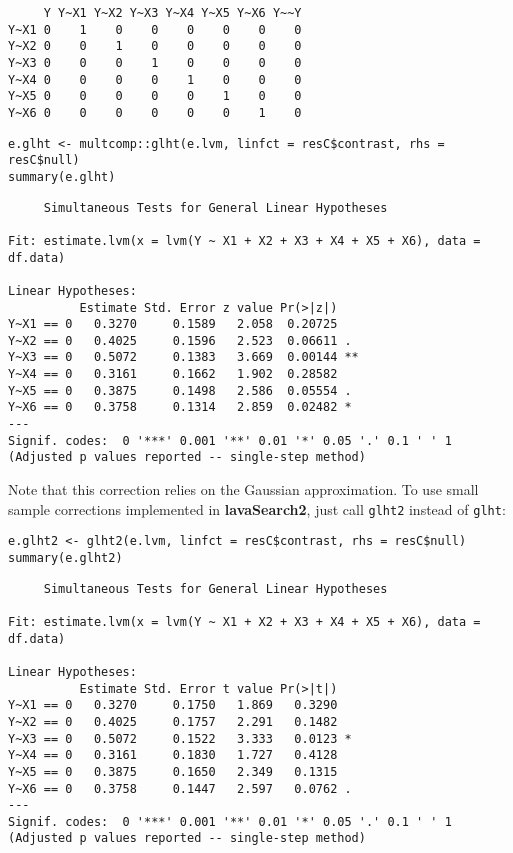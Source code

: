\documentclass[12pt]{article}
\begin{document}
\begin{verbatim}
     Y Y~X1 Y~X2 Y~X3 Y~X4 Y~X5 Y~X6 Y~~Y
Y~X1 0    1    0    0    0    0    0    0
Y~X2 0    0    1    0    0    0    0    0
Y~X3 0    0    0    1    0    0    0    0
Y~X4 0    0    0    0    1    0    0    0
Y~X5 0    0    0    0    0    1    0    0
Y~X6 0    0    0    0    0    0    1    0
\end{verbatim}

\lstset{language=r,label= ,caption= ,captionpos=b,numbers=none}
\begin{lstlisting}
e.glht <- multcomp::glht(e.lvm, linfct = resC$contrast, rhs = resC$null)
summary(e.glht)
\end{lstlisting}
\begin{verbatim}
	 Simultaneous Tests for General Linear Hypotheses

Fit: estimate.lvm(x = lvm(Y ~ X1 + X2 + X3 + X4 + X5 + X6), data = df.data)

Linear Hypotheses:
          Estimate Std. Error z value Pr(>|z|)   
Y~X1 == 0   0.3270     0.1589   2.058  0.20725   
Y~X2 == 0   0.4025     0.1596   2.523  0.06611 . 
Y~X3 == 0   0.5072     0.1383   3.669  0.00144 **
Y~X4 == 0   0.3161     0.1662   1.902  0.28582   
Y~X5 == 0   0.3875     0.1498   2.586  0.05554 . 
Y~X6 == 0   0.3758     0.1314   2.859  0.02482 * 
---
Signif. codes:  0 '***' 0.001 '**' 0.01 '*' 0.05 '.' 0.1 ' ' 1
(Adjusted p values reported -- single-step method)
\end{verbatim}

Note that this correction relies on the Gaussian approximation. To use
small sample corrections implemented in \textbf{lavaSearch2}, just call
\texttt{glht2} instead of \texttt{glht}:
\lstset{language=r,label= ,caption= ,captionpos=b,numbers=none}
\begin{lstlisting}
e.glht2 <- glht2(e.lvm, linfct = resC$contrast, rhs = resC$null)
summary(e.glht2)
\end{lstlisting}

\begin{verbatim}
	 Simultaneous Tests for General Linear Hypotheses

Fit: estimate.lvm(x = lvm(Y ~ X1 + X2 + X3 + X4 + X5 + X6), data = df.data)

Linear Hypotheses:
          Estimate Std. Error t value Pr(>|t|)  
Y~X1 == 0   0.3270     0.1750   1.869   0.3290  
Y~X2 == 0   0.4025     0.1757   2.291   0.1482  
Y~X3 == 0   0.5072     0.1522   3.333   0.0123 *
Y~X4 == 0   0.3161     0.1830   1.727   0.4128  
Y~X5 == 0   0.3875     0.1650   2.349   0.1315  
Y~X6 == 0   0.3758     0.1447   2.597   0.0762 .
---
Signif. codes:  0 '***' 0.001 '**' 0.01 '*' 0.05 '.' 0.1 ' ' 1
(Adjusted p values reported -- single-step method)
\end{verbatim}
\end{document}
